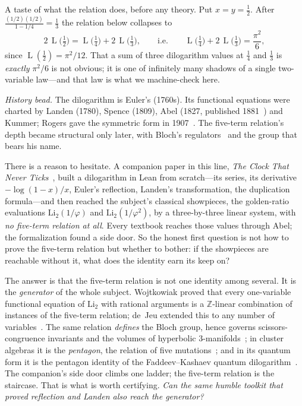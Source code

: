 \documentclass[11pt]{article}
\newcommand{\Li}{\mathrm{Li}_2}
\DeclareMathOperator{\Lrog}{L}
\begin{document}
A taste of what the relation does, before any theory. Put $x=y=\tfrac12$. After
$\tfrac{(1/2)(1/2)}{1-1/4}=\tfrac13$ the relation below collapses to
\[
  2\,\Lrog\!\big(\tfrac12\big)=\Lrog\!\big(\tfrac14\big)+2\,\Lrog\!\big(\tfrac13\big),
  \qquad\text{i.e.}\qquad \Lrog\!\big(\tfrac14\big)+2\,\Lrog\!\big(\tfrac13\big)=\frac{\pi^2}{6},
\]
since $\Lrog(\tfrac12)=\pi^2/12$. That a sum of three dilogarithm values at $\tfrac14$ and
$\tfrac13$ is \emph{exactly} $\pi^2/6$ is not obvious; it is one of infinitely many shadows
of a single two-variable law---and that law is what we machine-check here.

\emph{History bead.} The dilogarithm is Euler's (1760s). Its functional equations were
charted by Landen (1780), Spence (1809), Abel (1827, published 1881~\cite{abel}) and
Kummer; Rogers gave the symmetric form in 1907~\cite{rogers}. The five-term relation's depth
became structural only later, with Bloch's regulators~\cite{bloch} and the group that bears
his name.

There is a reason to hesitate. A companion paper in this line, \emph{The Clock That Never
Ticks}~\cite{clock}, built a dilogarithm in Lean from scratch---its series, its derivative
$-\log(1-x)/x$, Euler's reflection, Landen's transformation, the duplication
formula---and then reached the subject's classical showpieces, the golden-ratio evaluations
$\Li(1/\varphi)$ and $\Li(1/\varphi^2)$, by a three-by-three linear system, with \emph{no
five-term relation at all}. Every textbook reaches those values through Abel; the
formalization found a side door. So the honest first question is not how to prove the
five-term relation but whether to bother: if the showpieces are reachable without it, what
does the identity earn its keep on?

The answer is that the five-term relation is not one identity among several. It is the
\emph{generator} of the whole subject. Wojtkowiak proved that every one-variable functional
equation of $\Li$ with rational arguments is a $\mathbb{Z}$-linear combination of instances
of the five-term relation; de~Jeu extended this to any number of
variables~\cite{wojtkowiak,dejeu}. The same relation \emph{defines} the Bloch group, hence
governs scissors-congruence invariants and the volumes of hyperbolic
$3$-manifolds~\cite{bloch,suslin,neumannzagier}; in cluster algebras it is the
\emph{pentagon}, the relation of five mutations~\cite{nakanishi}; and in its quantum form it
is the pentagon identity of the Faddeev--Kashaev quantum dilogarithm~\cite{faddeevkashaev}.
The companion's side door climbs one ladder; the five-term relation is the staircase. That
is what is worth certifying. \emph{Can the same humble toolkit that proved reflection and
Landen also reach the generator?}
\end{document}
